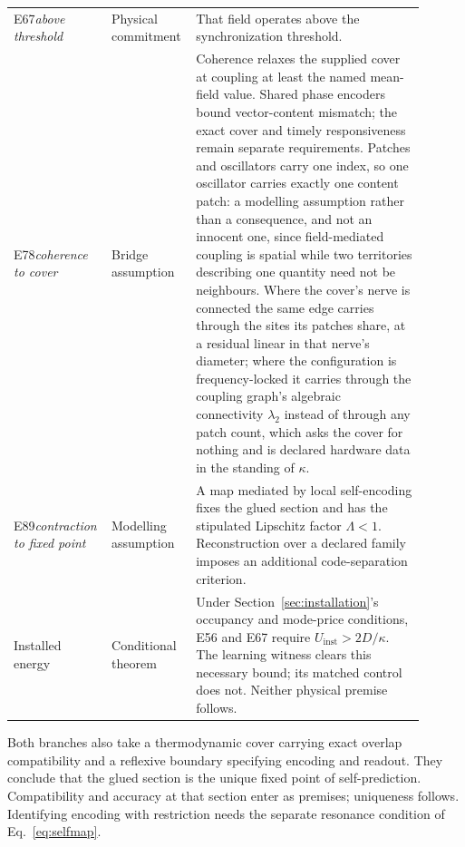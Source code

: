 \documentclass{article}
\begin{document}
\begin{longtable}{>{\raggedright\arraybackslash}p{0.17\linewidth}>{\raggedright\arraybackslash}p{0.19\linewidth}>{\raggedright\arraybackslash}p{0.54\linewidth}}
E67\newline\textit{above threshold} & Physical commitment & That field operates above the synchronization threshold. \\
E78\newline\textit{coherence to cover} & Bridge assumption & Coherence relaxes the supplied cover at coupling at least the named mean-field value. Shared phase encoders bound vector-content mismatch; the exact cover and timely responsiveness remain separate requirements. Patches and oscillators carry one index, so one oscillator carries exactly one content patch: a modelling assumption rather than a consequence, and not an innocent one, since field-mediated coupling is spatial while two territories describing one quantity need not be neighbours. Where the cover's nerve is connected the same edge carries through the sites its patches share, at a residual linear in that nerve's diameter; where the configuration is frequency-locked it carries through the coupling graph's algebraic connectivity $\lambda_2$ instead of through any patch count, which asks the cover for nothing and is declared hardware data in the standing of $\kappa$. \\
E89\newline\textit{contraction to fixed point} & Modelling assumption & A map mediated by local self-encoding fixes the glued section and has the stipulated Lipschitz factor $\Lambda<1$. Reconstruction over a declared family imposes an additional code-separation criterion. \\
Installed energy & Conditional theorem & Under Section~\ref{sec:installation}'s occupancy and mode-price conditions, E56 and E67 require $U_{\mathrm{inst}}>2D/\kappa$. The learning witness clears this necessary bound; its matched control does not. Neither physical premise follows. \\
\end{longtable}
\endgroup


Both branches also take a thermodynamic cover carrying exact overlap compatibility and a reflexive boundary specifying encoding and readout. They conclude that the glued section is the unique fixed point of self-prediction. Compatibility and accuracy at that section enter as premises; uniqueness follows. Identifying encoding with restriction needs the separate resonance condition of Eq.~\eqref{eq:selfmap}.
\end{document}

